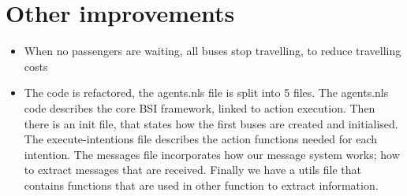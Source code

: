 \documentclass[a4paper]{article}
\begin{document}
\section{Other improvements}
\begin{itemize}
\item When no passengers are waiting, all buses stop travelling, to reduce travelling costs
\item The code is refactored, the agents.nls file is split into 5 files. The agents.nls code describes the core BSI framework, linked to action execution. Then there is an init file, that states how the first buses are created and initialised. The execute-intentions file describes the action functions needed for each intention. The messages file incorporates how our message system works; how to extract messages that are received. Finally we have a utils file that contains functions that are used in other function to extract information.  
\end{itemize}
\end{document}
